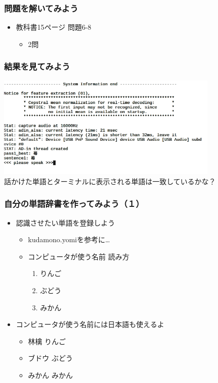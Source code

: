 \documentclass[14pt]{beamer}
\begin{document}
\begin{frame}
  \frametitle{問題を解いてみよう}
  \begin{itemize}
    \item 教科書15ページ 問題6-8
    \begin{itemize}
      \item 2問
    \end{itemize}
  \end{itemize}
\end{frame}

\begin{frame}
\frametitle{結果を見てみよう} 
  \centering
  \includegraphics[width=0.8\textwidth]{julius_demo_strawberry.png} \\
  話かけた単語とターミナルに表示される単語は一致しているかな？
\end{frame}

\begin{frame}
  \frametitle{自分の単語辞書を作ってみよう（１）}
  \begin{itemize}
    \item 認識させたい単語を登録しよう
    \begin{itemize}
      \item kudamono.yomiを参考に…
      \item \<コンピュータが使う名前\> \<読み方\>
      \renewcommand{\theenumi}{\roman{enumi}}
      \begin{enumerate}
        \item りんご
        \item ぶどう
        \item みかん
      \end{enumerate}
    \end{itemize}
    \item \<コンピュータが使う名前\>には日本語も使えるよ
    \begin{itemize}
      \item 林檎 りんご
      \item ブドウ ぶどう
      \item みかん みかん
    \end{itemize}
  \end{itemize}
\end{frame}
\end{document}
